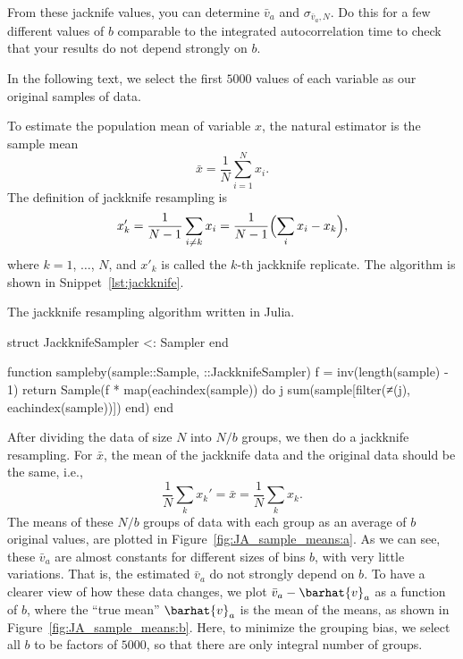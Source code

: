 From these jacknife values, you can determine \(\bar{v}_a\) and \(\sigma_{\bar{v}_a,N}\).
Do this for a few different values of \(b\) comparable to the integrated autocorrelation
time to check that your results do not depend strongly on \(b\).

\Answer{}
In the following text, we select the first \(5000\) values of each variable as our original
samples of data.

To estimate the population mean of variable \(x\),
the natural estimator is the sample mean
%
\begin{equation}
    \bar{x} = \frac{ 1 }{ N } \sum_{i=1}^N x_i.
\end{equation}
%
The definition of jackknife resampling is
%
\begin{equation}
    x_k' = \frac{1}{N - 1}
    \sum_{i \neq k} x_i = \frac{ 1 }{ N - 1 } \Bigl(\sum_i x_i - x_k \Bigr),
\end{equation}
%
where \(k = 1\), \(\ldots\), \(N\), and \(x'_k\) is called the \(k\)-th jackknife replicate.
The algorithm is shown in Snippet~\ref{lst:jackknife}.
%
\begin{algorithm}
    \caption{The jackknife resampling algorithm written in Julia.}
    \label{lst:jackknife}
    \begin{juliacode}
        struct JackknifeSampler <: Sampler end

        function sampleby(sample::Sample, ::JackknifeSampler)
            f = inv(length(sample) - 1)
            return Sample(f * map(eachindex(sample)) do j
                sum(sample[filter(≠(j), eachindex(sample))])
            end)
        end
    \end{juliacode}
\end{algorithm}

After dividing the data of size \(N\) into \(N/b\) groups, we then do a jackknife resampling.
For \(\bar{x}\), the mean of the jackknife data and the original data should be the
same, i.e.,
%
\begin{equation}
    \frac{ 1 }{ N } \sum_k x_k' = \bar{x} = \frac{ 1 }{ N } \sum_k x_k.
\end{equation}
%
The means of these \(N/b\) groups of data with each group as an average of \(b\) original
values, are plotted in Figure~\ref{fig:JA_sample_means:a}.
As we can see, these \(\bar{v}_a\) are almost constants for different sizes of bins \(b\),
with very little variations.
That is, the estimated \(\bar{v}_a\) do not strongly depend on \(b\).
To have a clearer view of how these data changes, we plot \(\bar{v}_a - \barhat{v}_a\)
as a function of \(b\), where the ``true mean'' \(\barhat{v}_a\) is the mean of
the means, as shown in Figure~\ref{fig:JA_sample_means:b}.
Here, to minimize the grouping bias, we select all \(b\) to be factors of \(5000\),
so that there are only integral number of groups.

